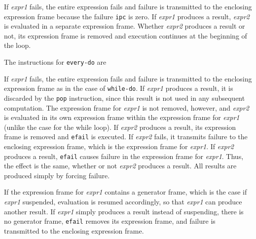 If \textit{expr1} fails, the entire expression fails and failure is
transmitted to the enclosing expression frame because the failure
\texttt{ipc} is zero. If \textit{expr1} produces a result,
\textit{expr2} is evaluated in a separate expression frame. Whether
\textit{expr2} produces a result or not, its expression frame is
removed and execution continues at the beginning of the loop.

The instructions for \texttt{every-do} are

\goodbreak
{}



If \textit{expr1} fails, the entire expression fails and failure is
transmitted to the enclosing expression frame as in the case of
\texttt{while-do}. If \textit{expr1} produces a result, it is
discarded by the \texttt{pop} instruction, since this result is not
used in any subsequent computation. The expression frame for
\textit{expr1} is not removed, however, and \textit{expr2} is
evaluated in its own expression frame within the expression frame for
\textit{expr1} (unlike the case for the while loop). If \textit{expr2}
produces a result, its expression frame is removed and \texttt{efail}
is executed. If \textit{expr2} fails, it transmits failure to the
enclosing expression frame, which is the expression frame for
\textit{expr1}. If \textit{expr2} produces a result, \texttt{efail}
causes failure in the expression frame for \textit{expr1}. Thus, the
effect is the same, whether or not \textit{expr2} produces a
result. All results are produced simply by forcing failure.

If the expression frame for \textit{expr1} contains a generator frame,
which is the case if \textit{expr1} suspended, evaluation is resumed
accordingly, so that \textit{expr1} can produce another result. If
\textit{expr1} simply produces a result instead of suspending, there
is no generator frame, \texttt{efail} removes its expression frame,
and failure is transmitted to the enclosing expression frame.


